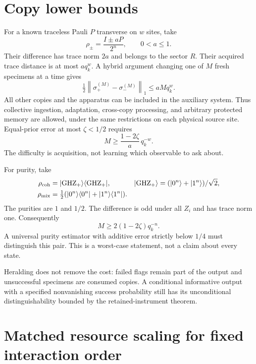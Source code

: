 \documentclass[11pt,a4paper]{article}
\newcommand{\norm}[1]{\left\lVert #1\right\rVert}
\newcommand{\ket}[1]{\lvert #1\rangle}
\newcommand{\bra}[1]{\langle #1\rvert}
\begin{document}
\section{Copy lower bounds}

For a known traceless Pauli $P$ transverse on $w$ sites, take
\begin{equation}
 \rho_\pm=\frac{I\pm aP}{2^n},\qquad 0<a\le1.
\end{equation}
Their difference has trace norm $2a$ and belongs to the sector $R$. Their acquired trace distance is at most $a q_k^w$. A hybrid argument changing one of $M$ fresh specimens at a time gives
\begin{equation}
 \tfrac12\norm{\sigma_+^{(M)}-\sigma_-^{(M)}}_1\le aM q_k^w.
\end{equation}
All other copies and the apparatus can be included in the auxiliary system. Thus collective ingestion, adaptation, cross-copy processing, and arbitrary protected memory are allowed, under the same restrictions on each physical source site. Equal-prior error at most $\zeta<1/2$ requires
\begin{equation}
 \boxed{M\ge\frac{1-2\zeta}{a}\,q_k^{-w}.}
 \label{eq:paulicopies}
\end{equation}
The difficulty is acquisition, not learning which observable to ask about.

For purity, take
\begin{align}
 \rho_{\rm coh}&=\ket{\mathrm{GHZ}_+}\bra{\mathrm{GHZ}_+},&
 \ket{\mathrm{GHZ}_+}&=(\ket{0^n}+\ket{1^n})/\sqrt2,\\
 \rho_{\rm mix}&=\tfrac12(\ket{0^n}\bra{0^n}+\ket{1^n}\bra{1^n}).
\end{align}
The purities are $1$ and $1/2$. The difference is odd under all $Z_i$ and has trace norm one. Consequently
\begin{equation}
 \boxed{M\ge2(1-2\zeta)q_k^{-n}.}
 \label{eq:puritycopies}
\end{equation}
A universal purity estimator with additive error strictly below $1/4$ must distinguish this pair. This is a worst-case statement, not a claim about every state.

Heralding does not remove the cost: failed flags remain part of the output and unsuccessful specimens are consumed copies. A conditional informative output with a specified nonvanishing success probability still has its unconditional distinguishability bounded by the retained-instrument theorem.

\section{Matched resource scaling for fixed interaction order}
\end{document}
